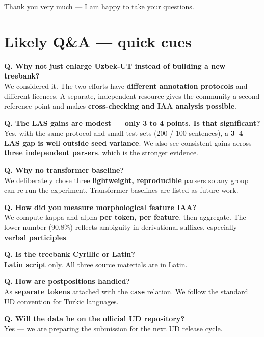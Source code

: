 \documentclass[12pt,a4paper]{article}
\begin{document}
Thank you very much — I am happy to take your questions.

\newpage
\section*{Likely Q\&A — quick cues}

\noindent\textbf{Q. Why not just enlarge Uzbek-UT instead of building a new treebank?}\\
We considered it. The two efforts have \textbf{different annotation protocols}
and different licences. A separate, independent resource gives the
community a second reference point and makes \textbf{cross-checking and IAA
analysis possible}.

\vspace{0.4em}
\noindent\textbf{Q. The LAS gains are modest — only 3 to 4 points. Is that significant?}\\
Yes, with the same protocol and small test sets (200 / 100 sentences), a
\textbf{3--4 LAS gap is well outside seed variance}. We also see consistent
gains across \textbf{three independent parsers}, which is the stronger
evidence.

\vspace{0.4em}
\noindent\textbf{Q. Why no transformer baseline?}\\
We deliberately chose three \textbf{lightweight, reproducible} parsers so any
group can re-run the experiment. Transformer baselines are listed as
future work.

\vspace{0.4em}
\noindent\textbf{Q. How did you measure morphological feature IAA?}\\
We compute kappa and alpha \textbf{per token, per feature}, then aggregate.
The lower number (90.8\%) reflects ambiguity in derivational
suffixes, especially \textbf{verbal participles}.

\vspace{0.4em}
\noindent\textbf{Q. Is the treebank Cyrillic or Latin?}\\
\textbf{Latin script} only. All three source materials are in Latin.

\vspace{0.4em}
\noindent\textbf{Q. How are postpositions handled?}\\
As \textbf{separate tokens} attached with the \texttt{case} relation.
We follow the standard UD convention for Turkic languages.

\vspace{0.4em}
\noindent\textbf{Q. Will the data be on the official UD repository?}\\
Yes — we are preparing the submission for the next UD release cycle.
\end{document}
